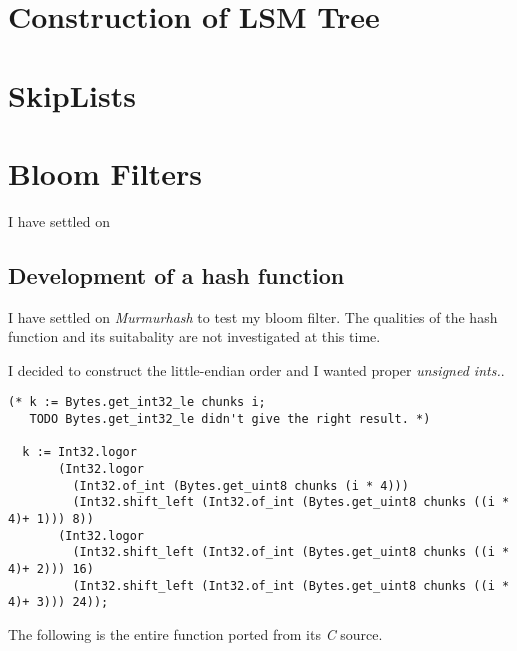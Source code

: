 \documentclass[../../../include/open-logic-chapter]{subfiles}
\begin{document}

\begin{abstract}
\end{abstract}
\newpage

	\section{ Construction of LSM Tree}
	\section{ SkipLists}
	\section{ Bloom Filters}

    I have settled on
	\subsection{ Development of a hash function }

    I have settled on \textit{Murmurhash} to test my bloom filter.
    The qualities of the hash function and its suitabality are not investigated at this time.

I decided to construct the little-endian order and I wanted proper
\textit{unsigned ints.}.

			\begin{lstlisting}[style=ocamlstyle,caption={Create little-endian order by shifting 8-bit sequences.}]
  (* k := Bytes.get_int32_le chunks i;
   TODO Bytes.get_int32_le didn't give the right result. *)

  k := Int32.logor
       (Int32.logor
         (Int32.of_int (Bytes.get_uint8 chunks (i * 4)))
         (Int32.shift_left (Int32.of_int (Bytes.get_uint8 chunks ((i * 4)+ 1))) 8))
       (Int32.logor
         (Int32.shift_left (Int32.of_int (Bytes.get_uint8 chunks ((i * 4)+ 2))) 16)
         (Int32.shift_left (Int32.of_int (Bytes.get_uint8 chunks ((i * 4)+ 3))) 24));
			\end{lstlisting}

The following is the entire function ported from its \textit{C} source.
\end{document}
